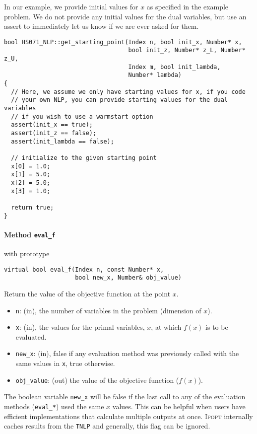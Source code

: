 \documentclass[10pt]{article}
\newcommand{\Ipopt}{\textsc{Ipopt}\xspace}
\begin{document}
In our example, we provide initial values for $x$ as specified in the
example problem. We do not provide any initial values for the dual
variables, but use an assert to immediately let us know if we are ever
asked for them.

\begin{footnotesize}
\begin{verbatim}
bool HS071_NLP::get_starting_point(Index n, bool init_x, Number* x,
                                   bool init_z, Number* z_L, Number* z_U,
                                   Index m, bool init_lambda,
                                   Number* lambda)
{
  // Here, we assume we only have starting values for x, if you code
  // your own NLP, you can provide starting values for the dual variables
  // if you wish to use a warmstart option
  assert(init_x == true);
  assert(init_z == false);
  assert(init_lambda == false);

  // initialize to the given starting point
  x[0] = 1.0;
  x[1] = 5.0;
  x[2] = 5.0;
  x[3] = 1.0;

  return true;
}
\end{verbatim}
\end{footnotesize}

\paragraph{Method {\texttt{eval\_f}}} with prototype
\begin{verbatim}
virtual bool eval_f(Index n, const Number* x, 
                    bool new_x, Number& obj_value)
\end{verbatim}
Return the value of the objective function at the point $x$.
\begin{itemize}
\item {\tt n}: (in), the number of variables in the problem (dimension
  of $x$).
\item {\tt x}: (in), the values for the primal variables, $x$, at which
  $f(x)$ is to be evaluated.
\item {\tt new\_x}: (in), false if any evaluation method was
  previously called with the same values in {\tt x}, true otherwise.
\item {\tt obj\_value}: (out) the value of the objective function
  ($f(x)$).
\end{itemize}

The boolean variable {\tt new\_x} will be false if the last call to
any of the evaluation methods ({\tt eval\_*}) used the same $x$
values. This can be helpful when users have efficient implementations
that calculate multiple outputs at once. \Ipopt internally caches
results from the {\tt TNLP} and generally, this flag can be ignored.
\end{document}
